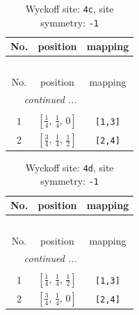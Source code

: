 \documentclass[fleqn,8pt]{jsarticle}
\begin{document}
\renewcommand{\arraystretch}{1.2}
\begin{longtable}{ccc}
\caption{Wyckoff site: {\tt 4c}, site symmetry: {\tt -1}}
 \\
 \hline \hline
No. & position & mapping \\ \hline \endfirsthead

\multicolumn{2}{l}{\tablename\ \thetable{}} \\
 \hline \hline
No. & position & mapping \\ \hline \endhead

 \hline \hline
\multicolumn{2}{r}{\footnotesize\it continued ...} \\ \endfoot

 \hline \hline
\multicolumn{2}{r}{} \\ \endlastfoot

1 & $\left[ \frac{1}{4},\, \frac{1}{4},\, 0 \right]$ & {\tt [1,3]} \\ \hline
2 & $\left[ \frac{3}{4},\, \frac{1}{4},\, \frac{1}{2} \right]$ & {\tt [2,4]} \\
\end{longtable}
\renewcommand{\arraystretch}{1.2}
\begin{longtable}{ccc}
\caption{Wyckoff site: {\tt 4d}, site symmetry: {\tt -1}}
 \\
 \hline \hline
No. & position & mapping \\ \hline \endfirsthead

\multicolumn{2}{l}{\tablename\ \thetable{}} \\
 \hline \hline
No. & position & mapping \\ \hline \endhead

 \hline \hline
\multicolumn{2}{r}{\footnotesize\it continued ...} \\ \endfoot

 \hline \hline
\multicolumn{2}{r}{} \\ \endlastfoot

1 & $\left[ \frac{1}{4},\, \frac{1}{4},\, \frac{1}{2} \right]$ & {\tt [1,3]} \\ \hline
2 & $\left[ \frac{3}{4},\, \frac{1}{4},\, 0 \right]$ & {\tt [2,4]} \\
\end{longtable}
\renewcommand{\arraystretch}{1.2}
\end{document}

